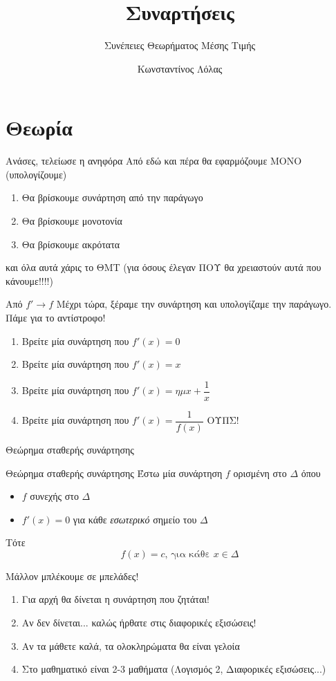 \documentclass{presentation}
\title{Συναρτήσεις}
\subtitle{Συνέπειες Θεωρήματος Μέσης Τιμής}
\author[Λόλας]{Κωνσταντίνος Λόλας}
\institute[$10^ο$ ΓΕΛ]{$10^ο$ ΓΕΛ Θεσσαλονίκης}
\begin{document}
\begin{frame}
  \titlepage
\end{frame}

\section{Θεωρία}
\begin{frame}{Ανάσες, τελείωσε η ανηφόρα}
  Από εδώ και πέρα θα εφαρμόζουμε ΜΟΝΟ (υπολογίζουμε)
  \begin{enumerate}
    \item<1-> Θα βρίσκουμε συνάρτηση από την παράγωγο
    \item<2-> Θα βρίσκουμε μονοτονία
    \item<3-> Θα βρίσκουμε ακρότατα
  \end{enumerate}
   και όλα αυτά χάρις το ΘΜΤ (για όσους έλεγαν ΠΟΥ θα χρειαστούν αυτά που κάνουμε!!!!)
\end{frame}

\begin{frame}{Από $f'\to f$}
  Μέχρι τώρα, ξέραμε την συνάρτηση και υπολογίζαμε την παράγωγο. Πάμε για το αντίστροφο!
  \begin{enumerate}
    \item<1-> Βρείτε μία συνάρτηση που $f'(x)=0$
    \item<2-> Βρείτε μία συνάρτηση που $f'(x)=x$
    \item<3-> Βρείτε μία συνάρτηση που $f'(x)=ημx+\dfrac{1}{x}$
    \item<4-> Βρείτε μία συνάρτηση που $f'(x)=\dfrac{1}{f(x)}$ ΟΥΠΣ!
  \end{enumerate}
\end{frame}

\begin{frame}{Θεώρημα σταθερής συνάρτησης}
  \begin{block}{Θεώρημα σταθερής συνάρτησης}
    Έστω μία συνάρτηση $f$ ορισμένη στο $Δ$ όπου
    \begin{itemize}
      \item $f$ συνεχής στο $Δ$
      \item $f'(x)=0$ για κάθε \emph{εσωτερικό} σημείο του $Δ$
    \end{itemize}
    Τότε
    $$f(x)=c \text{, για κάθε } x\in Δ$$
  \end{block}
\end{frame}

\begin{frame}{Μάλλον μπλέκουμε σε μπελάδες!}
  \begin{enumerate}
    \item<1-> Για αρχή θα δίνεται η συνάρτηση που ζητάται!
    \item<2-> Αν δεν δίνεται... καλώς ήρθατε στις διαφορικές εξισώσεις!
    \item<3-> Αν τα μάθετε καλά, τα ολοκληρώματα θα είναι γελοία
    \item<4-> Στο μαθηματικό είναι 2-3 μαθήματα (Λογισμός 2, Διαφορικές εξισώσεις...)
  \end{enumerate}
\end{frame}
\end{document}
